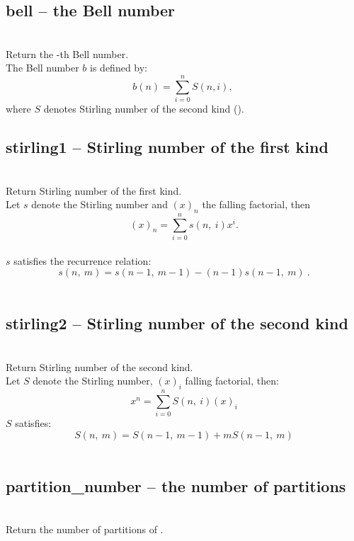   \subsection{bell -- the Bell number}
   \\
   \spacing
   \quad Return the -th Bell number.\\
   \spacing
   \quad The Bell number \(b\) is defined by:
   \[b(n) = \sum_{i=0}^{n} S(n, i),\ \]
   where \(S\) denotes Stirling number of the second kind ().\\

  \subsection{stirling1 -- Stirling number of the first kind}
   \\
   \spacing
   \quad Return Stirling number of the first kind.\\
   \spacing
   \quad Let \(s\) denote the Stirling number and \((x)_n\) the falling factorial, then
   \[(x)_n = \sum_{i=0}^{n} s(n,\ i) x^i. \]\\
   \(s\) satisfies the recurrence relation:
   \[s(n,\ m) = s(n-1,\ m-1) - (n-1)s(n-1,\ m)\ .\]\\

  \subsection{stirling2 -- Stirling number of the second kind}
   \\
   \spacing
   \quad Return Stirling number of the second kind.\\
   \spacing
   \quad Let \(S\) denote the Stirling number, \((x)_i\) falling factorial, then:
   \[x^n = \sum_{i=0}^{n} S(n,\ i) (x)_i\]
   \(S\) satisfies:
   \[S(n,\ m) = S(n-1,\ m-1) + m S(n-1,\ m)\]\\

  \subsection{partition\_number -- the number of partitions}
   \\
   \spacing
   \quad Return the number of partitions of .\\

